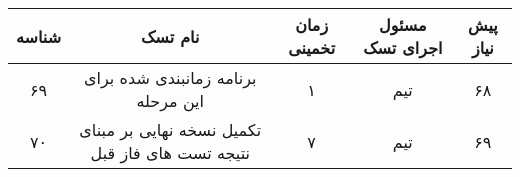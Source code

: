 \begin{table}[H]
    \centering
    \begin{tabular}{|c|c|c|c|c|} \hline 
        شناسه & نام تسک & زمان تخمینی & مسئول اجرای تسک & پیش نیاز \\\hline
        ۶۹ & برنامه زمانبندی شده برای این مرحله & ۱ & تیم & ۶۸ \\\hline
        ۷۰ & تکمیل نسخه نهایی بر مبنای نتیجه تست های فاز قبل & ۷ & تیم & ۶۹ \\\hline
        
    \end{tabular}              
\end{table}